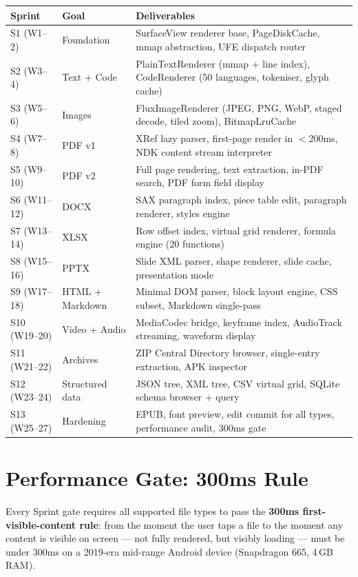 \documentclass[11pt, a4paper, openright]{report}
\begin{document}
\begin{longtable}{@{}p{14mm}p{24mm}p{108mm}@{}}
\toprule
\textbf{Sprint} & \textbf{Goal} & \textbf{Deliverables} \\
\midrule
S1 (W1--2) & Foundation & SurfaceView renderer base, PageDiskCache, mmap abstraction, UFE dispatch router \\
S2 (W3--4) & Text + Code & PlainTextRenderer (mmap + line index), CodeRenderer (50 languages, tokeniser, glyph cache) \\
S3 (W5--6) & Images & FluxImageRenderer (JPEG, PNG, WebP, staged decode, tiled zoom), BitmapLruCache \\
S4 (W7--8) & PDF v1 & XRef lazy parser, first-page render in $<$200ms, NDK content stream interpreter \\
S5 (W9--10) & PDF v2 & Full page rendering, text extraction, in-PDF search, PDF form field display \\
S6 (W11--12) & DOCX & SAX paragraph index, piece table edit, paragraph renderer, styles engine \\
S7 (W13--14) & XLSX & Row offset index, virtual grid renderer, formula engine (20 functions) \\
S8 (W15--16) & PPTX & Slide XML parser, shape renderer, slide cache, presentation mode \\
S9 (W17--18) & HTML + Markdown & Minimal DOM parser, block layout engine, CSS subset, Markdown single-pass \\
S10 (W19--20) & Video + Audio & MediaCodec bridge, keyframe index, AudioTrack streaming, waveform display \\
S11 (W21--22) & Archives & ZIP Central Directory browser, single-entry extraction, APK inspector \\
S12 (W23--24) & Structured data & JSON tree, XML tree, CSV virtual grid, SQLite schema browser + query \\
S13 (W25--27) & Hardening & EPUB, font preview, edit commit for all types, performance audit, 300ms gate \\
\bottomrule
\end{longtable}

\section{Performance Gate: 300ms Rule}

Every Sprint gate requires all supported file types to pass the \textbf{300ms first-visible-content rule}: from the moment the user taps a file to the moment any content is visible on screen --- not fully rendered, but visibly loading --- must be under 300ms on a 2019-era mid-range Android device (Snapdragon 665, 4\,GB RAM).
\end{document}
